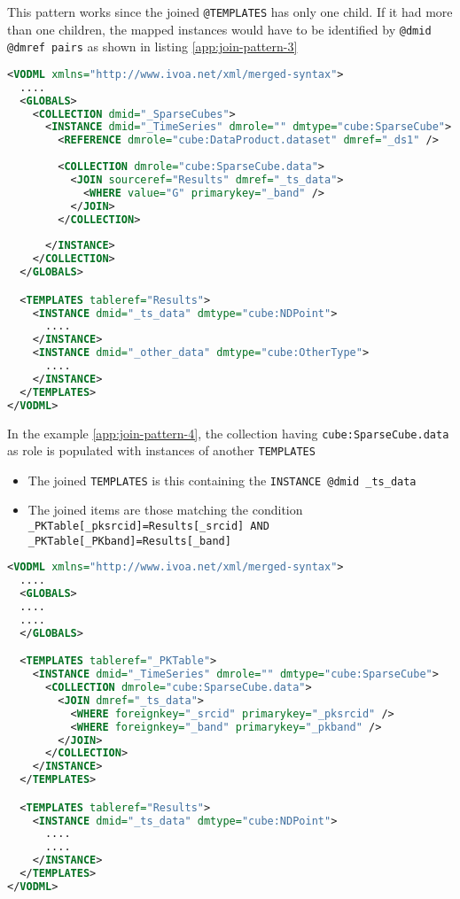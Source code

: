 This pattern works since the joined \texttt{@TEMPLATES} has only one child. 
If it had more than one children, the mapped instances would have to be identified by  \texttt{@dmid \texttt{@dmref} pairs} as shown in listing \ref{app:join-pattern-3}

\begin{lstlisting}[label={app:join-pattern-3},caption={Joining a \texttt{TEMPLATES} with a global \texttt{COLLECTION} identified by both \texttt{@sourceref} and \texttt{@dmid} \texttt{@dmref} pairs},language=XML]
<VODML xmlns="http://www.ivoa.net/xml/merged-syntax">
  ....
  <GLOBALS>
    <COLLECTION dmid="_SparseCubes">
      <INSTANCE dmid="_TimeSeries" dmrole="" dmtype="cube:SparseCube">
        <REFERENCE dmrole="cube:DataProduct.dataset" dmref="_ds1" />
        
        <COLLECTION dmrole="cube:SparseCube.data">
          <JOIN sourceref="Results" dmref="_ts_data">
            <WHERE value="G" primarykey="_band" />
          </JOIN>
        </COLLECTION>
        
      </INSTANCE>
    </COLLECTION>
  </GLOBALS>

  <TEMPLATES tableref="Results">
    <INSTANCE dmid="_ts_data" dmtype="cube:NDPoint">
      ....
    </INSTANCE>
    <INSTANCE dmid="_other_data" dmtype="cube:OtherType">
      ....
    </INSTANCE>
  </TEMPLATES>
</VODML>
\end{lstlisting}  

In the example \ref{app:join-pattern-4}, the collection having \texttt{cube:SparseCube.data} as role is populated with  instances of another \texttt{TEMPLATES}
\begin{itemize}
  \item The joined \texttt{TEMPLATES} is this containing the  \texttt{INSTANCE \texttt{@dmid} \_ts\_data}
  \item The joined items are those matching the condition  \texttt{\_PKTable[\_pksrcid]=Results[\_srcid] AND  \_PKTable[\_PKband]=Results[\_band]}
\end{itemize}


\begin{lstlisting}[label={app:join-pattern-4},caption={Joining two \texttt{TEMPLATES} together with \texttt{@dmid} \texttt{@dmref} pairs},language=XML]
<VODML xmlns="http://www.ivoa.net/xml/merged-syntax">
  ....
  <GLOBALS>
  ....
  ....
  </GLOBALS>

  <TEMPLATES tableref="_PKTable">
    <INSTANCE dmid="_TimeSeries" dmrole="" dmtype="cube:SparseCube">
      <COLLECTION dmrole="cube:SparseCube.data">
        <JOIN dmref="_ts_data">
          <WHERE foreignkey="_srcid" primarykey="_pksrcid" />
          <WHERE foreignkey="_band" primarykey="_pkband" />
        </JOIN>
      </COLLECTION>
    </INSTANCE>
  </TEMPLATES>

  <TEMPLATES tableref="Results">
    <INSTANCE dmid="_ts_data" dmtype="cube:NDPoint">
      ....
      ....
    </INSTANCE>
  </TEMPLATES>
</VODML>
\end{lstlisting}  

